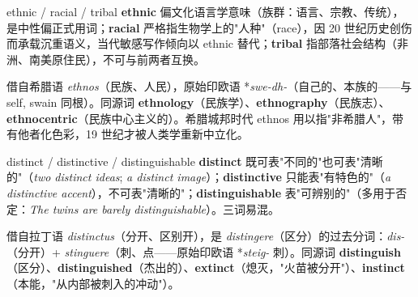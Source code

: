 \documentclass[../main.tex]{subfiles}
\begin{document}
\begin{lex}{ethnic / racial / tribal}
\textbf{ethnic} 偏文化语言学意味（族群：语言、宗教、传统），是中性偏正式用词；\textbf{racial} 严格指生物学上的"人种"（race），因 20 世纪历史创伤而承载沉重语义，当代敏感写作倾向以 ethnic 替代；\textbf{tribal} 指部落社会结构（非洲、南美原住民），不可与前两者互换。
\end{lex}

\begin{origin}
借自希腊语 \textit{ethnos}（民族、人民），原始印欧语 *\textit{swe-dh-}（自己的、本族的——与 self, swain 同根）。同源词 \textbf{ethnology}（民族学）、\textbf{ethnography}（民族志）、\textbf{ethnocentric}（民族中心主义的）。希腊城邦时代 ethnos 用以指"非希腊人"，带有他者化色彩，19 世纪才被人类学重新中立化。
\end{origin}





\begin{gram}{distinct / distinctive / distinguishable}
\textbf{distinct} 既可表"不同的"也可表"清晰的"（\textit{two distinct ideas}; \textit{a distinct image}）；\textbf{distinctive} 只能表"有特色的"（\textit{a distinctive accent}），不可表"清晰的"；\textbf{distinguishable} 表"可辨别的"（多用于否定：\textit{The twins are barely distinguishable}）。三词易混。
\end{gram}

\begin{origin}
借自拉丁语 \textit{distinctus}（分开、区别开），是 \textit{distingere}（区分）的过去分词：\textit{dis-}（分开）+ \textit{stinguere}（刺、点——原始印欧语 *\textit{steig-} 刺）。同源词 \textbf{distinguish}（区分）、\textbf{distinguished}（杰出的）、\textbf{extinct}（熄灭，"火苗被分开"）、\textbf{instinct}（本能，"从内部被刺入的冲动"）。
\end{origin}
\end{document}

